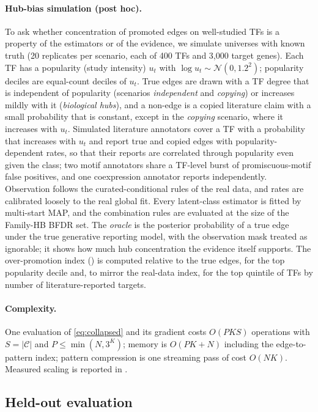 \documentclass[11pt,a4paper]{article}
\begin{document}
\paragraph{Hub-bias simulation (post hoc).} To ask whether concentration of promoted edges on well-studied TFs is a property of the estimators or of the evidence, we simulate universes with known truth (20 replicates per scenario, each of 400 TFs and 3{,}000 target genes).
Each TF has a popularity (study intensity) $u_t$ with $\log u_t\sim\mathcal{N}(0,1.2^2)$; popularity deciles are equal-count deciles of $u_t$.
True edges are drawn with a TF degree that is independent of popularity (scenarios \emph{independent} and \emph{copying}) or increases mildly with it (\emph{biological hubs}), and a non-edge is a copied literature claim with a small probability that is constant, except in the \emph{copying} scenario, where it increases with $u_t$.
Simulated literature annotators cover a TF with a probability that increases with $u_t$ and report true and copied edges with popularity-dependent rates, so that their reports are correlated through popularity even given the class; two motif annotators share a TF-level burst of promiscuous-motif false positives, and one coexpression annotator reports independently.
Observation follows the curated-conditional rules of the real data, and rates are calibrated loosely to the real global fit.
Every latent-class estimator is fitted by multi-start MAP, and the combination rules are evaluated at the size of the Family-HB BFDR set.
The \emph{oracle} is the posterior probability of a true edge under the true generative reporting model, with the observation mask treated as ignorable; it shows how much hub concentration the evidence itself supports.
The over-promotion index () is computed relative to the true edges, for the top popularity decile and, to mirror the real-data index, for the top quintile of TFs by number of literature-reported targets.

\paragraph{Complexity.} One evaluation of \eqref{eq:collapsed} and its gradient costs $O(PKS)$ operations with $S=|\mathcal{C}|$ and $P\le\min(N,3^K)$; memory is $O(PK+N)$ including the edge-to-pattern index; pattern compression is one streaming pass of cost $O(NK)$. Measured scaling is reported in .

\subsection{Held-out evaluation}\label{sec:eval}
\end{document}
